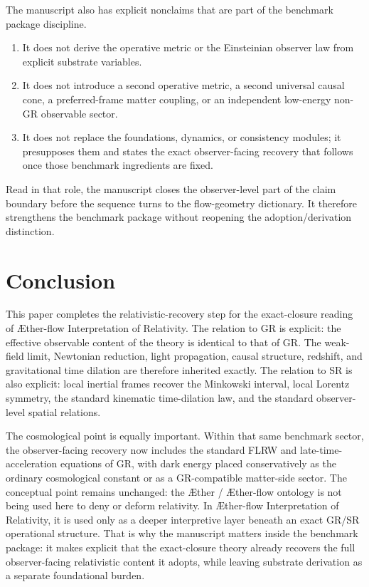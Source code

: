 \documentclass[11pt]{article}
\newcommand{\Aether}{\AE{}ther}
\newcommand{\Aflow}{\AE{}ther-flow}
\newcommand{\TheoryName}{\Aflow{} Interpretation of Relativity}
\begin{document}
The manuscript also has explicit nonclaims that are part of the benchmark package discipline.
\begin{enumerate}
    \item It does not derive the operative metric or the Einsteinian observer law from explicit substrate variables.
    \item It does not introduce a second operative metric, a second universal causal cone, a preferred-frame matter coupling, or an independent low-energy non-GR observable sector.
    \item It does not replace the foundations, dynamics, or consistency modules; it presupposes them and states the exact observer-facing recovery that follows once those benchmark ingredients are fixed.
\end{enumerate}

Read in that role, the manuscript closes the observer-level part of the claim boundary before the sequence turns to the flow-geometry dictionary. It therefore strengthens the benchmark package without reopening the adoption/derivation distinction.

\section{Conclusion}

This paper completes the relativistic-recovery step for the exact-closure reading of \TheoryName{}. The relation to GR is explicit: the effective observable content of the theory is identical to that of GR. The weak-field limit, Newtonian reduction, light propagation, causal structure, redshift, and gravitational time dilation are therefore inherited exactly. The relation to SR is also explicit: local inertial frames recover the Minkowski interval, local Lorentz symmetry, the standard kinematic time-dilation law, and the standard observer-level spatial relations.

The cosmological point is equally important. Within that same benchmark sector, the observer-facing recovery now includes the standard FLRW and late-time-acceleration equations of GR, with dark energy placed conservatively as the ordinary cosmological constant or as a GR-compatible matter-side sector. The conceptual point remains unchanged: the \Aether{} / \Aflow{} ontology is not being used here to deny or deform relativity. In \TheoryName{}, it is used only as a deeper interpretive layer beneath an exact GR/SR operational structure. That is why the manuscript matters inside the benchmark package: it makes explicit that the exact-closure theory already recovers the full observer-facing relativistic content it adopts, while leaving substrate derivation as a separate foundational burden.


\end{document}
